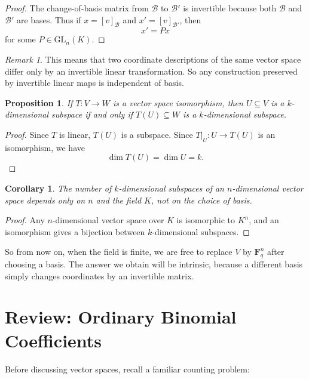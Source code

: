 \documentclass[11pt]{article}
\newtheorem{proposition}[theorem]{Proposition}
\newtheorem{corollary}[theorem]{Corollary}
\theoremstyle{definition}
\theoremstyle{remark}
\newtheorem{remark}[theorem]{Remark}
\newcommand{\F}{\mathbf{F}}
\newcommand{\GL}{\mathrm{GL}}
\begin{document}
	\begin{proof}
		The change-of-basis matrix from \(\mathcal{B}\) to \(\mathcal{B}'\) is invertible because both \(\mathcal{B}\) and \(\mathcal{B}'\) are bases. Thus if \(x=[v]_{\mathcal{B}}\) and \(x'=[v]_{\mathcal{B}'}\), then
		\[
		x' = Px
		\]
		for some \(P\in\GL_n(K)\).
	\end{proof}
	
	\begin{remark}
		This means that two coordinate descriptions of the same vector space differ only by an invertible linear transformation. So any construction preserved by invertible linear maps is independent of basis.
	\end{remark}
	
	\begin{proposition}
		If \(T:V\to W\) is a vector space isomorphism, then \(U\subseteq V\) is a \(k\)-dimensional subspace if and only if \(T(U)\subseteq W\) is a \(k\)-dimensional subspace.
	\end{proposition}
	
	\begin{proof}
		Since \(T\) is linear, \(T(U)\) is a subspace. Since \(T|_U:U\to T(U)\) is an isomorphism, we have
		\[
		\dim T(U)=\dim U=k.
		\]
	\end{proof}
	
	\begin{corollary}
		The number of \(k\)-dimensional subspaces of an \(n\)-dimensional vector space depends only on \(n\) and the field \(K\), not on the choice of basis.
	\end{corollary}
	
	\begin{proof}
		Any \(n\)-dimensional vector space over \(K\) is isomorphic to \(K^n\), and an isomorphism gives a bijection between \(k\)-dimensional subspaces.
	\end{proof}
	
	So from now on, when the field is finite, we are free to replace \(V\) by \(\F_q^n\) after choosing a basis. The answer we obtain will be intrinsic, because a different basis simply changes coordinates by an invertible matrix.
	
	\section{Review: Ordinary Binomial Coefficients}
	
	Before discussing vector spaces, recall a familiar counting problem:
	
\end{document}
